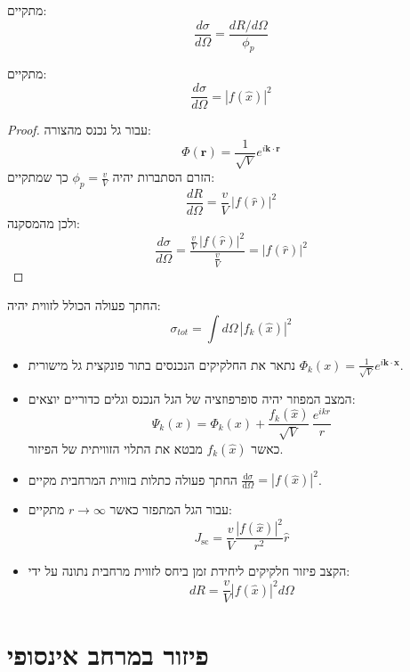 \documentclass{tstextbook}
\begin{document}
\begin{corollary}
מתקיים:
$$\frac{d\sigma}{d\Omega}=\frac{d R/d\Omega}{\phi_{p}}$$

\end{corollary}
\begin{proposition}
מתקיים:
$$\frac{d\sigma}{d\Omega}=|f(\hat{x})|^{2}$$

\end{proposition}
\begin{proof}
עבור גל נכנס מהצורה:
$$\Phi(\mathbf{r})={\frac{1}{\sqrt{V}}}e^{i\mathbf{k}\cdot\mathbf{r}}$$
הזרם הסתברות יהיה \(\phi_{p}=\frac{v}{V}\) כך שמתקיים:
$$\frac{d R}{d\Omega}=\frac{v}{V}\,|f(\hat{r})|^{2}$$
ולכן מהמסקנה:
$$\frac{d\sigma}{d\Omega}=\frac{\frac{v}{V}\,|f(\hat{r})|^{2}}{\frac{v}{V}}=|f(\hat{r})|^{2}$$

\end{proof}
\begin{corollary}
החתך פעולה הכולל לזווית יהיה:
$$\sigma_{t o t}=\int d\Omega\,|f_{k}(\hat{x})|^{2}$$

\end{corollary}
\begin{summary}
  \begin{itemize}
    \item נתאר את החלקיקים הנכנסים בתור פונקצית גל מישורית \(\Phi_{k}(x)=\frac{1}{\sqrt{ V }}e^{ i\mathbf{k}\cdot \mathbf{x} }\).
    \item המצב המפוזר יהיה סופרפוזציה של הגל הנכנס וגלים כדוריים יוצאים:
$$\Psi_{k}(x)=\Phi_{k}(x)+\frac{f_{k}(\hat{x})}{\sqrt{V}}\,\frac{e^{i k r}}{r}$$
כאשר \(f_{k}\left( \hat{x} \right)\) מבטא את התלוי הזוויתית של הפיזור.
    \item החתך פעולה כתלות בזווית המרחבית מקיים \(\frac{\mathrm{d} \sigma}{\mathrm{d} \Omega}=\left\lvert  f\left( \hat{x} \right)  \right\rvert^{2}\).
    \item עבור הגל המתפזר כאשר \(r\to \infty\) מתקיים:
$$J_{\mathrm{sc}}={\frac{v}{V}}{\frac{|f({\hat{x}})|^{2}}{r^{2}}}{\hat{r}}$$
    \item הקצב פיזור חלקיקים ליחידת זמן ביחס לזווית מרחבית נתונה על ידי:
$$d R=\frac{v}{V}|f(\hat{x})|^{2}d\Omega$$
  \end{itemize}
\end{summary}
\section{פיזור במרחב אינסופי}
\end{document}
